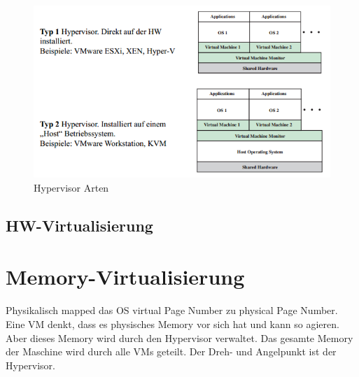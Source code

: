 \begin{figure}[h!]
\centering
\includegraphics[width=0.8\linewidth]{fig/hypervisor-types}
\caption{Hypervisor Arten}
\label{fig:hypervisor-types}
\end{figure}


\subsection{HW-Virtualisierung}

\section{Memory-Virtualisierung}
Physikalisch mapped das OS virtual Page Number zu physical Page Number. Eine VM denkt, dass es physisches Memory vor sich hat und kann so agieren. Aber dieses Memory wird durch den Hypervisor verwaltet. Das gesamte Memory der Maschine wird durch alle VMs geteilt. Der Dreh- und Angelpunkt ist der Hypervisor.

